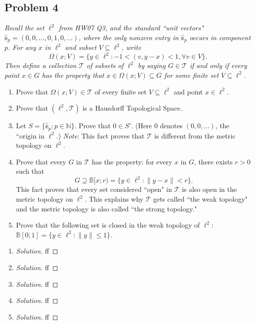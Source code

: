 \documentclass{article}
\newcommand{\N}{{\mathbb N}}
\begin{document}
\subsection*{Problem 4}
{\it Recall the set $\ell^2$ from HW07 Q3,
and the standard ``unit vectors" $\hat{\mathbb{e}}_p = (0,0,\dots,0,1,0,\dots)$,
where the only nonzero entry in $\hat{\mathbb{e}}_p$ occurs in component $p$.
For any $x$ in $\ell^2$ and subset $V \subseteq \ell^2$, write
\[
	\Omega(x;V) = \{y \in \ell^2 \colon -1 < (v,y-x)<1, \forall v \in V\}.
\]
Then define a collection $\mathcal{T}$ of subsets of $\ell^2$ by saying
$G \in \mathcal{T}$ if and only if every point $x \in G$ has the property
that $x \in \Omega(x;V) \subseteq G$ for some \emph{finite set} $V \subseteq \ell^2$.
\begin{enumerate}
	\item Prove that $\Omega(x;V) \in \mathcal{T}$ of every finite set
		$V \subseteq \ell^2$ and point $x \in \ell^2$.
	\item Prove that $(\ell^2, \mathcal{T})$ is a Hausdorff Topological Space.
	\item Let $S = \{\hat{\mathbb{e}}_p \colon p \in \N\}$.
		Prove that $0 \in S'$.
		(Here $0$ denotes $(0,0,\dots)$, the ``origin in $\ell^2$.)
		\emph{Note}: This fact proves that $\mathcal{T}$ is
		different from the metric topology on $\ell^2$.
	\item Prove that every $G$ in $\mathcal{T}$ has the property:
		for every $x$ in $G$, there exists $r>0$ such that
		\[
			G \supseteq \mathbb{B}[x;r) = \{y \in \ell^2 \colon
			\lVert y - x \rVert < r\}.
		\]
		This fact proves that every set considered ``open" in $\mathcal{T}$
		is also open in the metric topology on $\ell^2$.
		This explains why $\mathcal{T}$ gets called ``the weak topology"
		and the metric topology is also called ``the strong topology."
	\item Prove that the following set is closed in the weak topology of $\ell^2$:
		$\mathbb{B}[0;1] = \{y \in \ell^2 \colon \lVert y \rVert \leq 1\}$.
\end{enumerate}}

\begin{enumerate}
	\item \begin{proof}[Solution]\let\qed\relax
		ff
	\end{proof}
	\item \begin{proof}[Solution]\let\qed\relax
		ff
	\end{proof}
	\item \begin{proof}[Solution]\let\qed\relax
		ff
	\end{proof}
	\item \begin{proof}[Solution]\let\qed\relax
		ff
	\end{proof}
	\item \begin{proof}[Solution]\let\qed\relax
		ff
	\end{proof}
\end{enumerate}
\clearpage
\end{document}
